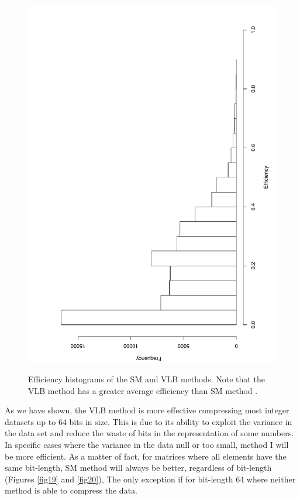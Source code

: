 \documentclass[10pt]{article}
\begin{document}
\begin{figure}[h]
{  \includegraphics[scale=0.25,angle=-90]{fig18}
  \label{fig:18}
  }
  \caption{Efficiency histograms of the SM and VLB methods. Note that the VLB method has a greater average efficiency than SM method .}
  \label{fig:1718}
\end{figure}

As we have shown, the VLB method is more effective compressing most integer datasets up to 64 bits in size. This is due to its ability to exploit the variance in the data set and reduce the waste of bits in the representation of some numbers. In specific cases where the variance in the data null or too small, method I will be more efficient. As a matter of fact, for matrices where all elements have the same bit-length, SM method  will always be better, regardless of bit-length (Figures \ref{fig19} and \ref{fig20}), The only exception if for bit-length 64 where neither method is able to compress the data. 
\end{document}

